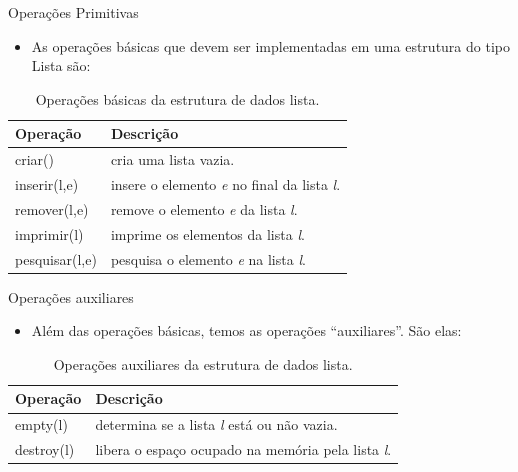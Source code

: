 \begin{frame}{Operações Primitivas}
  \begin{itemize}
	  \item As operações básicas que devem ser implementadas em uma estrutura do tipo Lista são:		
  \end{itemize}
  \begin{table}[ht]
			  \centering
						\begin{tabular}{l|l}
						    \hline \textbf{Operação} & \textbf{Descrição} \\
						    \hline criar() & cria uma lista vazia.\\
						    \hline inserir(l,e) & insere o elemento \textit{e} no final da lista \textit{l}.\\
						    \hline remover(l,e) & remove o elemento \textit{e} da lista \textit{l}.\\
						    \hline imprimir(l) & imprime os elementos da lista \textit{l}.\\
						    \hline pesquisar(l,e) & pesquisa o elemento \textit{e} na lista \textit{l}.\\
						    \hline 
						\end{tabular}
						\caption{Operações básicas da estrutura de dados lista.}
				\end{table}
\end{frame}
 
\begin{frame}{Operações auxiliares}   
			\begin{itemize}
				\item Além das operações básicas, temos as operações ``auxiliares''. São elas:
			\end{itemize}
			\begin{table}[ht]
			  \centering
						\begin{tabular}{l|l}
						    \hline \textbf{Operação} & \textbf{Descrição} \\						    
						    \hline empty(l) & determina se a lista \textit{l} está ou não vazia.\\
						    \hline destroy(l) & libera o espaço ocupado na memória pela lista \textit{l}.\\
						    \hline 
						\end{tabular}
						\caption{Operações auxiliares da estrutura de dados lista.}
				\end{table}
  \end{frame}


